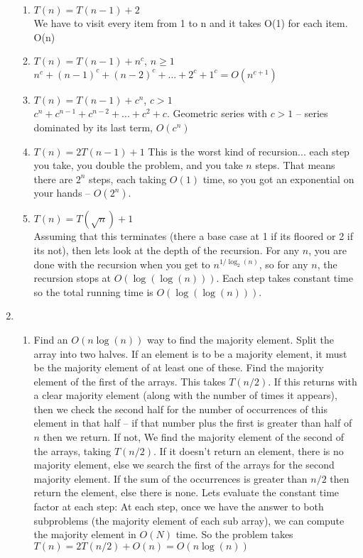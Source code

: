\documentclass[11pt]{article}
\begin{document}
\begin{enumerate}
\begin{enumerate}
\item $T(n) = T(n-1) + 2$\\
We have to visit every item from 1 to n and it takes O(1) for each item. O(n)
\item $T(n) = T(n-1) + n^c$, $n\ge 1$\\
$n^c+(n-1)^c+(n-2)^c+...+2^c+1^c=O(n^{c+1})$
\item $T(n) = T(n-1) + c^n$, $c> 1$\\
$c^n+c^{n-1}+c^{n-2}+...+c^2+c$. Geometric series with $c>1$ -- series dominated by its last term, $O(c^n)$
\item $T(n)=2T(n-1)+1$
This is the worst kind of recursion... each step you take, you double the problem, and you take $n$ steps. That means there are $2^n$ steps, each taking $O(1)$ time, so you got an exponential on your hands -- $O(2^n)$.
\item $T(n)=T(\sqrt{n})+1$\\
Assuming that this terminates (there a base case at 1 if its floored or 2 if its not), then lets look at the depth of the recursion. For any $n$, you are done with the recursion when you get to $n^{1/\log_2(n)}$, so for any $n$, the recursion stops at $O(\log(\log(n)))$. Each step takes constant time so the total running time is $O(\log(\log(n)))$.
\end{enumerate}
\newpage
\item 
\begin{enumerate}
\item Find an $O(n\log(n))$ way to find the majority element. Split the array into two halves. If an element is to be a majority element, it must be the majority element of at least one of these. Find the majority element of the first of the arrays. This takes $T(n/2)$. If this returns with a clear majority element (along with the number of times it appears), then we check the second half for the number of occurrences of this element in that half -- if that number plus the first is greater than half of $n$ then we return. If not, We find the majority element of the second of the arrays, taking $T(n/2)$. If it doesn't return an element, there is no majority element, else we search the first of the arrays for the second majority element. If the sum of the occurrences is greater than $n/2$ then return the element, else there is none. Lets evaluate the constant time factor at each step: At each step, once we have the answer to both subproblems (the majority element of each sub array), we can compute the majority element in $O(N)$ time. So the problem takes $T(n)=2T(n/2)+O(n)=O(n\log(n))$

\end{enumerate}
\end{enumerate}
\end{document}
